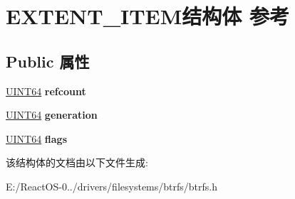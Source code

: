 \hypertarget{struct_e_x_t_e_n_t___i_t_e_m}{}\section{E\+X\+T\+E\+N\+T\+\_\+\+I\+T\+E\+M结构体 参考}
\label{struct_e_x_t_e_n_t___i_t_e_m}
\subsection*{Public 属性}
\begin{DoxyCompactItemize}
\item 
\mbox{\label{struct_e_x_t_e_n_t___i_t_e_m_afde7b0e4520c7dbc621d175953841c87}} 
\hyperlink{_processor_bind_8h_a57be03562867144161c1bfee95ca8f7c}{U\+I\+N\+T64} {\bfseries refcount}
\item 
\mbox{\label{struct_e_x_t_e_n_t___i_t_e_m_a3528594efcbd9debc013ad952b0b2ca3}} 
\hyperlink{_processor_bind_8h_a57be03562867144161c1bfee95ca8f7c}{U\+I\+N\+T64} {\bfseries generation}
\item 
\mbox{\label{struct_e_x_t_e_n_t___i_t_e_m_a06ea76d7457dcf01e11f880165741f52}} 
\hyperlink{_processor_bind_8h_a57be03562867144161c1bfee95ca8f7c}{U\+I\+N\+T64} {\bfseries flags}
\end{DoxyCompactItemize}


该结构体的文档由以下文件生成\+:\begin{DoxyCompactItemize}
\item 
E\+:/\+React\+O\+S-\/0../drivers/filesystems/btrfs/btrfs.\+h\end{DoxyCompactItemize}
